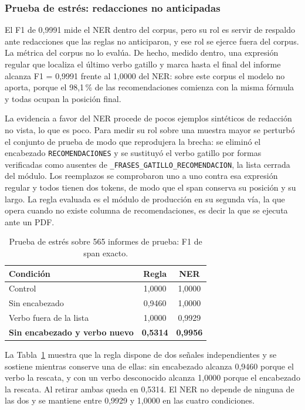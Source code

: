 \documentclass[10pt,journal,a4paper]{IEEEtran}
\newcommand{\codename}[1]{\texttt{#1}}
\begin{document}
\subsubsection{Prueba de estr\'es: redacciones no anticipadas}\label{sec:estres}
El F1 de 0,9991 mide el NER dentro del corpus, pero su rol es servir de respaldo ante redacciones que las reglas no anticiparon, y ese rol se ejerce fuera del corpus. La m\'etrica del corpus no lo eval\'ua. De hecho, medido dentro, una expresi\'on regular que localiza el \'ultimo verbo gatillo y marca hasta el final del informe alcanza F1 = 0,9991 frente al 1,0000 del NER: sobre este corpus el modelo no aporta, porque el 98,1\,\% de las recomendaciones comienza con la misma f\'ormula y todas ocupan la posici\'on final.

La evidencia a favor del NER procede de pocos ejemplos sint\'eticos de redacci\'on no vista, lo que es poco. Para medir su rol sobre una muestra mayor se perturb\'o el conjunto de prueba de modo que reprodujera la brecha: se elimin\'o el encabezado \codename{RECOMENDACIONES} y se sustituy\'o el verbo gatillo por formas verificadas como ausentes de \codename{\_FRASES\_GATILLO\_RECOMENDACION}, la lista cerrada del m\'odulo. Los reemplazos se comprobaron uno a uno contra esa expresi\'on regular y todos tienen dos tokens, de modo que el span conserva su posici\'on y su largo. La regla evaluada es el m\'odulo de producci\'on en su segunda v\'ia, la que opera cuando no existe columna de recomendaciones, es decir la que se ejecuta ante un PDF.

\begin{table}[!t]
\caption{Prueba de estr\'es sobre 565 informes de prueba: F1 de span exacto.}
\label{tab:estres}
\centering
\begin{tabular}{@{}lcc@{}}
\toprule
\textbf{Condici\'on} & \textbf{Regla} & \textbf{NER} \\
\midrule
Control & 1,0000 & 1,0000 \\
Sin encabezado & 0,9460 & 1,0000 \\
Verbo fuera de la lista & 1,0000 & 0,9929 \\
\textbf{Sin encabezado y verbo nuevo} & \textbf{0,5314} & \textbf{0,9956} \\
\bottomrule
\end{tabular}
\end{table}

La Tabla~\ref{tab:estres} muestra que la regla dispone de dos se\~nales independientes y se sostiene mientras conserve una de ellas: sin encabezado alcanza 0,9460 porque el verbo la rescata, y con un verbo desconocido alcanza 1,0000 porque el encabezado la rescata. Al retirar ambas queda en 0,5314. El NER no depende de ninguna de las dos y se mantiene entre 0,9929 y 1,0000 en las cuatro condiciones.
\end{document}
